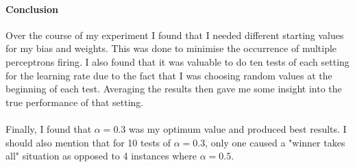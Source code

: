 \documentclass[twocolumn]{article}
\begin{document}
\paragraph{Conclusion} 
Over the course of my experiment I found that I needed different starting values for my bias and weights. This was done to minimise the occurrence of multiple perceptrons firing.
I also found that it was valuable to do ten tests of each setting for the learning rate due to the fact that I was choosing random values at the beginning of each test. Averaging the
results then gave me some insight into the true performance of that setting. \\\\
Finally, I found that $\alpha =  0.3$ was my optimum value and produced best results. I should also mention that for 10 tests of $\alpha = 0.3$, only one caused a "winner takes all" 
situation as opposed to 4 instances where $\alpha = 0.5$.


\end{document}
